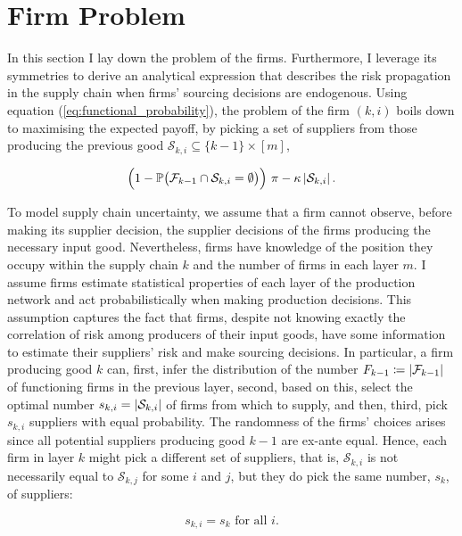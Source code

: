 \documentclass[../../main.tex]{subfiles}
\begin{document}
\section{Firm Problem}

In this section I lay down the problem of the firms. Furthermore, I leverage its symmetries to derive an analytical expression that describes the risk propagation in the supply chain when firms' sourcing decisions are endogenous. Using equation (\ref{eq:functional_probability}), the problem of the firm $(k, i)$ boils down to maximising the expected payoff, by picking a set of suppliers from those producing the previous good $\mathcal{S}_{k, i} \subseteq \{k - 1\} \times [m]$, 

\begin{equation}
  \Big(1 - \mathbb{P}\big( \mathcal{F}_{k - 1} \cap \mathcal{S}_{k, i} = \emptyset \big) \Big) \ \pi  - \kappa \left\lvert\mathcal{S}_{k, i} \right\rvert.
\end{equation}


To model supply chain uncertainty, we assume that a firm cannot observe, before making its supplier decision, the supplier decisions of the firms producing the necessary input good. Nevertheless, firms have knowledge of the position they occupy within the supply chain $k$ and the number of firms in each layer $m$. I assume firms estimate statistical properties of each layer of the production network and act probabilistically when making production decisions. This assumption captures the fact that firms, despite not knowing exactly the correlation of risk among producers of their input goods, have some information to estimate their suppliers' risk and make sourcing decisions. In particular, a firm producing good $k$ can, first, infer the distribution of the number $F_{k - 1} \coloneqq \left\lvert\mathcal{F}_{k - 1}\right\rvert$ of functioning firms in the previous layer, second, based on this, select the optimal number $s_{k, i} = \left\lvert\mathcal{S}_{k, i}\right\rvert$ of firms from which to supply, and then, third, pick $s_{k, i}$ suppliers with equal probability. The randomness of the firms' choices arises since all potential suppliers producing good $k - 1$ are ex-ante equal. Hence, each firm in layer $k$ might pick a different set of suppliers, that is, $\mathcal{S}_{k, i}$ is not necessarily equal to $\mathcal{S}_{k, j}$ for some $i$ and $j$, but they do pick the same number, $s_k$, of suppliers:

\begin{equation}
  s_{k, i} = s_k \text{ for all } i.
\end{equation}
\end{document}
